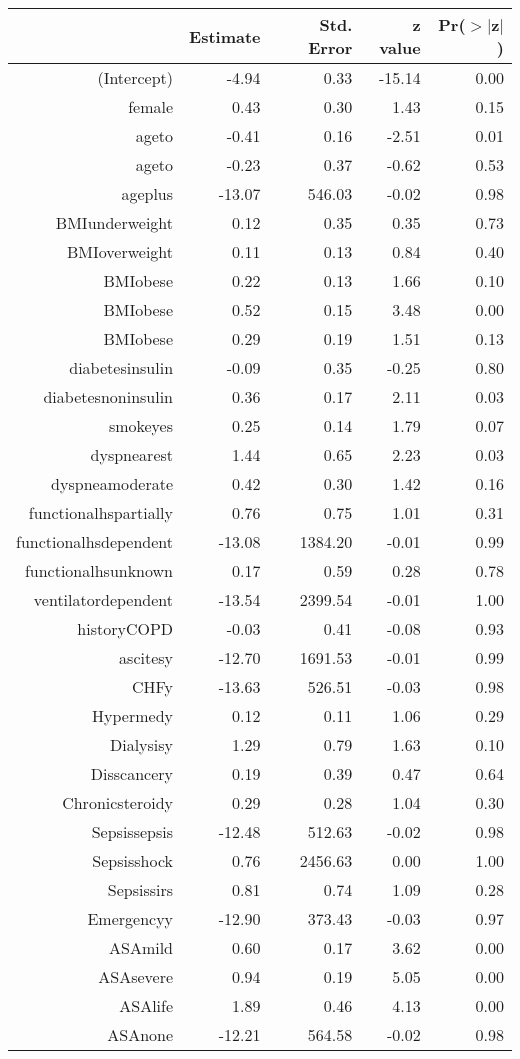 \begin{tabular}{rrrrr}
  \hline
 & Estimate & Std. Error & z value & Pr($>$$|$z$|$) \\ 
  \hline
(Intercept) & -4.94 & 0.33 & -15.14 & 0.00 \\ 
  female & 0.43 & 0.30 & 1.43 & 0.15 \\ 
  age\-65\-to\-74 & -0.41 & 0.16 & -2.51 & 0.01 \\ 
  age\-75\-to\-84 & -0.23 & 0.37 & -0.62 & 0.53 \\ 
  age\-85\-plus & -13.07 & 546.03 & -0.02 & 0.98 \\ 
  BMI\-underweight & 0.12 & 0.35 & 0.35 & 0.73 \\ 
  BMI\-overweight & 0.11 & 0.13 & 0.84 & 0.40 \\ 
  BMI\-obese\-1 & 0.22 & 0.13 & 1.66 & 0.10 \\ 
  BMI\-obese\-2 & 0.52 & 0.15 & 3.48 & 0.00 \\ 
  BMI\-obese\-3 & 0.29 & 0.19 & 1.51 & 0.13 \\ 
  diabetes\-insulin & -0.09 & 0.35 & -0.25 & 0.80 \\ 
  diabetes\-noninsulin & 0.36 & 0.17 & 2.11 & 0.03 \\ 
  smoke\-yes & 0.25 & 0.14 & 1.79 & 0.07 \\ 
  dyspnea\-rest & 1.44 & 0.65 & 2.23 & 0.03 \\ 
  dyspnea\-moderate & 0.42 & 0.30 & 1.42 & 0.16 \\ 
  functional\-hs\-partially & 0.76 & 0.75 & 1.01 & 0.31 \\ 
  functional\-hs\-dependent & -13.08 & 1384.20 & -0.01 & 0.99 \\ 
  functional\-hs\-unknown & 0.17 & 0.59 & 0.28 & 0.78 \\ 
  ventilator\-dependent & -13.54 & 2399.54 & -0.01 & 1.00 \\ 
  history\-COPD & -0.03 & 0.41 & -0.08 & 0.93 \\ 
  ascites\-y & -12.70 & 1691.53 & -0.01 & 0.99 \\ 
  CHF\-y & -13.63 & 526.51 & -0.03 & 0.98 \\ 
  Hyper\-med\-y & 0.12 & 0.11 & 1.06 & 0.29 \\ 
  Dialysis\-y & 1.29 & 0.79 & 1.63 & 0.10 \\ 
  Diss\-cancer\-y & 0.19 & 0.39 & 0.47 & 0.64 \\ 
  Chronic\-steroid\-y & 0.29 & 0.28 & 1.04 & 0.30 \\ 
  Sepsis\-sepsis & -12.48 & 512.63 & -0.02 & 0.98 \\ 
  Sepsis\-shock & 0.76 & 2456.63 & 0.00 & 1.00 \\ 
  Sepsis\-sirs & 0.81 & 0.74 & 1.09 & 0.28 \\ 
  Emergency\-y & -12.90 & 373.43 & -0.03 & 0.97 \\ 
  ASA\-mild & 0.60 & 0.17 & 3.62 & 0.00 \\ 
  ASA\-severe & 0.94 & 0.19 & 5.05 & 0.00 \\ 
  ASA\-life & 1.89 & 0.46 & 4.13 & 0.00 \\ 
  ASA\-none & -12.21 & 564.58 & -0.02 & 0.98 \\ 
   \hline
\end{tabular}
